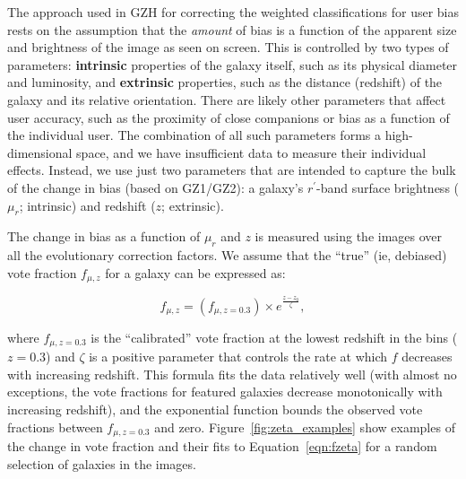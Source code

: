 \documentclass[twocolumn]{aastex6}
\begin{document}
The approach used in GZH for correcting the weighted classifications for user bias rests on the assumption that the \emph{amount} of bias is a function of the apparent size and brightness of the image as seen on screen. This is controlled by two types of parameters: \textbf{intrinsic} properties of the galaxy itself, such as its physical diameter and luminosity, and \textbf{extrinsic} properties, such as the distance (redshift) of the galaxy and its relative orientation. There are likely other parameters that affect user accuracy, such as the proximity of close companions \citep[``distraction bias''; see][]{joh15} or bias as a function of the individual user. The combination of all such parameters forms a high-dimensional space, and we have insufficient data to measure their individual effects. Instead, we use just two parameters that are intended to capture the bulk of the change in bias (based on GZ1/GZ2): a galaxy's $r^\prime$-band surface brightness ($\mu_r$; intrinsic) and redshift ($z$; extrinsic). 

The change in bias as a function of $\mu_r$ and $z$ is measured using the \ferengi{} images over all the evolutionary correction factors. We assume that the ``true'' (ie, debiased) vote fraction $f_{\mu,z}$ for a galaxy can be expressed as:

\begin{equation}
f_{\mu,z} = \left(f_{\mu,z=0.3}\right) \times e^{{\frac{z-z_0}{\zeta}}},
\label{eqn:fzeta}
\end{equation}

\noindent where $f_{\mu,z=0.3}$ is the ``calibrated'' vote fraction at the lowest redshift in the \ferengi{} bins ($z=0.3$) and $\zeta$ is a positive parameter that controls the rate at which $f$ decreases with increasing redshift. This formula fits the data relatively well (with almost no exceptions, the vote fractions for featured galaxies decrease monotonically with increasing redshift), and the exponential function bounds the observed vote fractions between $f_{\mu,z=0.3}$ and zero. Figure~\ref{fig:zeta_examples} show examples of the change in vote fraction and their fits to Equation~\ref{eqn:fzeta} for a random selection of galaxies in the \ferengi{} images. 
\end{document}
